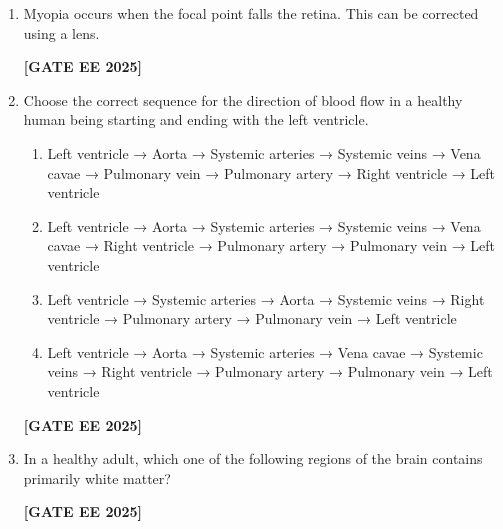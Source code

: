 \documentclass[journal]{IEEEtran}
\newcommand{\qfooter}{%
  \begin{flushright}\footnotesize\textbf{[GATE EE 2025]}\end{flushright}\vspace{1em}%
}
\begin{document}
\begin{enumerate}
\begin{enumerate}
\end{enumerate}
\qfooter

\item Myopia occurs when the focal point falls \underline{\hspace{2cm}}the retina. This can be corrected using a \underline{\hspace{2cm}} lens.

\begin{enumerate}
\end{enumerate}
\qfooter


\item Choose the correct sequence for the direction of blood flow in a healthy human being starting and ending with the left ventricle.

\begin{enumerate}

\item Left ventricle → Aorta → Systemic arteries → Systemic veins → Vena cavae → Pulmonary vein → Pulmonary artery → Right ventricle → Left ventricle
\item Left ventricle → Aorta → Systemic arteries → Systemic veins → Vena cavae → Right ventricle → Pulmonary artery → Pulmonary vein → Left ventricle
\item Left ventricle → Systemic arteries → Aorta → Systemic veins → Right ventricle → Pulmonary artery → Pulmonary vein → Left ventricle
\item Left ventricle → Aorta → Systemic arteries → Vena cavae → Systemic veins → Right ventricle → Pulmonary artery → Pulmonary vein → Left ventricle

\end{enumerate}
\qfooter

\item In a healthy adult, which one of the following regions of the brain contains primarily white matter?

\begin{enumerate}
\end{enumerate}
\qfooter


\end{enumerate}
\end{document}

